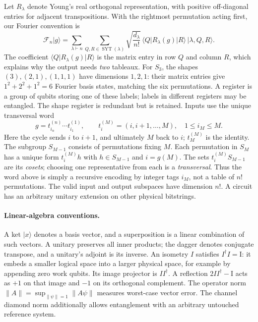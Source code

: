 \documentclass[11pt]{article}
\theoremstyle{definition}
\newcommand{\ket}[1]{\lvert #1\rangle}
\newcommand{\bra}[1]{\langle #1\rvert}
\newcommand{\norm}[1]{\lVert #1\rVert}
\newcommand{\F}{\mathcal F}
\newcommand{\Id}{\mathrm I}
\newcommand{\SYT}{\operatorname{SYT}}
\begin{document}
Let $R_\lambda$ denote Young's real orthogonal representation, with positive
off-diagonal entries for adjacent transpositions. With the rightmost
permutation acting first, our Fourier convention is
\begin{equation}\label{eq:qft}
 \F_n\ket g=\sum_{\lambda\vdash n}\sum_{Q,R\in\SYT(\lambda)}
 \sqrt{\frac{d_\lambda}{n!}}\,
 \bra Q R_\lambda(g)\ket R\,\ket{\lambda,Q,R}.
\end{equation}
The coefficient $\bra Q R_\lambda(g)\ket R$ is the matrix entry in row
$Q$ and column $R$, which explains why the output needs \emph{two}
tableaux. For $S_3$, the shapes $(3),(2,1),(1,1,1)$ have dimensions
$1,2,1$: their matrix entries give $1^2+2^2+1^2=6$ Fourier basis states,
matching the six permutations. A register is a group of qubits storing
one of these labels; labels in different registers may be entangled.
The shape register is redundant but is retained. Inputs use the unique
transversal word
\[
 g=t_{i_n}^{(n)}\cdots t_{i_1}^{(1)},\qquad
 t_i^{(M)}=(i,i+1,\ldots,M),\quad 1\le i_M\le M.
\]
Here the cycle sends $i$ to $i+1$, and ultimately $M$ back to $i$;
$t_M^{(M)}$ is the identity. The subgroup $S_{M-1}$ consists of
permutations fixing $M$. Each permutation in $S_M$ has a unique form
$t_i^{(M)}h$ with $h\in S_{M-1}$ and $i=g(M)$.
The sets $t_i^{(M)}S_{M-1}$ are its \emph{cosets}; choosing one
representative from each is a \emph{transversal}. Thus the word above
is simply a recursive encoding by integer tags $i_M$, not a table of
$n!$ permutations.
The valid input and output subspaces have dimension $n!$. A circuit has an
arbitrary unitary extension on other physical bitstrings.

\paragraph{Linear-algebra conventions.}
A ket $\ket x$ denotes a basis vector, and a superposition is a linear
combination of such vectors. A unitary preserves all inner products;
the dagger denotes conjugate transpose, and a unitary's adjoint is its inverse.
An isometry $I$ satisfies $I^\dagger I=\Id$: it embeds a smaller logical
space into a larger physical space, for example by appending zero work
qubits. Its image projector is $II^\dagger$. A reflection
$2II^\dagger-\Id$ acts as $+1$ on that image and $-1$ on its orthogonal
complement. The operator norm $\norm A=\sup_{\norm\psi=1}\norm{A\psi}$
measures worst-case vector error. The channel diamond norm additionally
allows entanglement with an arbitrary untouched reference system.
\end{document}
